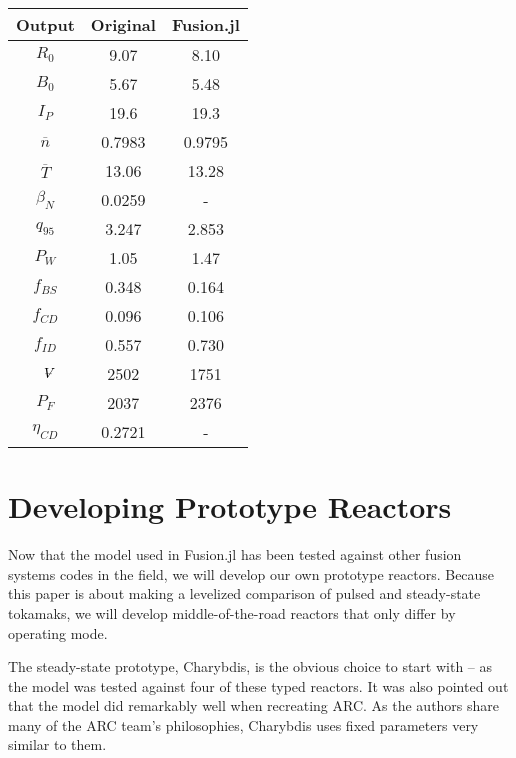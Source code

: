 \begin{table}[h!]
\begin{subtable}[t]{0.5\textwidth}
\begin{tabular}{ c|c|c }
Output           & Original         & Fusion.jl        \\
\hline
$R_{0}$          & 9.07            & 8.10             \\
$B_{0}$          & 5.67            & 5.48            \\
$I_{P}$          & 19.6             & 19.3           \\
$\overline n$    & 0.7983           & 0.9795          \\
$\overline T$    & 13.06            & 13.28           \\
$\beta_{N}$       & 0.0259           & -          \\
$q_{95}$         & 3.247            & 2.853           \\
$P_{W}$          & 1.05             & 1.47           \\
$f_{BS}$         & 0.348            & 0.164          \\
$f_{CD}$         & 0.096            & 0.106          \\
$f_{ID}$         & 0.557            & 0.730          \\
$\volume$         & 2502           & 1751          \\
$P_{F}$          & 2037           & 2376          \\
$\eta_{CD}$      & 0.2721           & -     

\end{tabular}
\end{subtable}
\hfill
\hfill
\end{table}

\section{Developing Prototype Reactors}

Now that the model used in Fusion.jl has been tested against other fusion systems codes in the field, we will develop our own prototype reactors. Because this paper is about making a levelized comparison of pulsed and steady-state tokamaks, we will develop middle-of-the-road reactors that only differ by operating mode. 

The steady-state prototype, Charybdis, is the obvious choice to start with -- as the model was tested against four of these typed reactors. It was also pointed out that the model did remarkably well when recreating ARC. As the authors share many of the ARC team's philosophies, Charybdis uses fixed parameters very similar to them.

